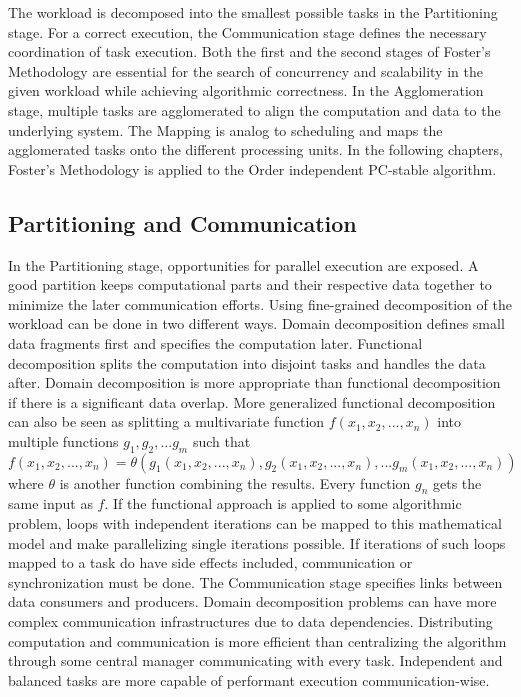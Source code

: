 The workload is decomposed into the smallest possible tasks in the Partitioning stage. For a correct execution, the Communication stage defines the necessary coordination of task execution. Both the first and the second stages of Foster's Methodology are essential for the search of concurrency and scalability in the given workload while achieving algorithmic correctness. In the Agglomeration stage, multiple tasks are agglomerated to align the computation and data to the underlying system. The Mapping is analog to scheduling and maps the agglomerated tasks onto the different processing units. In the following chapters, Foster's Methodology is applied to the Order independent PC-stable algorithm.

\subsection{Partitioning and Communication}
In the Partitioning stage, opportunities for parallel execution are exposed. A good partition keeps computational parts and their respective data together to minimize the later communication efforts. Using fine-grained decomposition of the workload can be done in two different ways. Domain decomposition defines small data fragments first and specifies the computation later. Functional decomposition splits the computation into disjoint tasks and handles the data after. Domain decomposition is more appropriate than functional decomposition if there is a significant data overlap.
More generalized functional decomposition can also be seen as splitting a multivariate function $f(x_1,x_2,...,x_n)$ into multiple functions ${g_1,g_2,...g_m}$ such that $f(x_1,x_2,...,x_n) = \theta(g_1(x_1,x_2,...,x_n),g_2(x_1,x_2,...,x_n),...g_m(x_1,x_2,...,x_n))$ where $\theta$ is another function combining the results. Every function $g_n$ gets the same input as $f$. If the functional approach is applied to some algorithmic problem, loops with independent iterations can be mapped to this mathematical model and make parallelizing single iterations possible. If iterations of such loops mapped to a task do have side effects included, communication or synchronization must be done.
The Communication stage specifies links between data consumers and producers. Domain decomposition problems can have more complex communication infrastructures due to data dependencies. Distributing computation and communication is more efficient than centralizing the algorithm through some central manager communicating with every task. Independent and balanced tasks are more capable of performant execution communication-wise.

